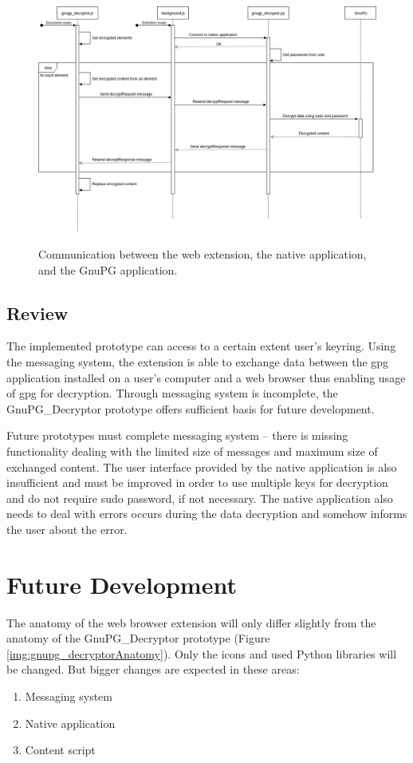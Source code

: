 \begin{figure}[H]
    \begin{center}
        \label{img:gnupg_decryptor-sequence}
        \includegraphics[width=1.3\textwidth,angle=90]{obrazky-figures/sequence-gnupg_decryptor.png}
        \caption{Communication between the web extension, the native application, and the GnuPG application.}
    \end{center}
\end{figure}

\subsection{Review}
The implemented prototype can access to a certain extent user's keyring. Using the messaging system, the extension is able to exchange data between the gpg application installed on a user's computer and a web browser thus enabling usage of gpg for decryption. Through messaging system is incomplete, the GnuPG\_Decryptor prototype offers sufficient basis for future development.

Future prototypes must complete messaging system -- there is missing functionality dealing with the limited size of messages and maximum size of exchanged content. The user interface provided by the native application is also insufficient and must be improved in order to use multiple keys for decryption and do not require sudo password, if not necessary. The native application also needs to deal with errors occurs during the data decryption and somehow informs the user about the error.

\section{Future Development}
The anatomy of the web browser extension will only differ slightly from the anatomy of the GnuPG\_Decryptor prototype (Figure \ref{img:gnupg_decryptorAnatomy}). Only the icons and used Python libraries will be changed. But bigger changes are expected in these areas:
\begin{enumerate}
    \item Messaging system
    \item Native application
    \item Content script
\end{enumerate}

